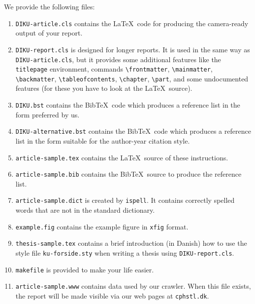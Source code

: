 \documentclass{DIKU-report}[2006/05/09]
\begin{document}
We provide the following files:
\begin{enumerate}
\item
\texttt{DIKU-article.cls} contains the \LaTeX\ code for producing the
camera-ready output of your report.

\item 
\texttt{DIKU-report.cls} is designed for longer reports.
It is used in the same way as \texttt{DIKU-article.cls}, but it
provides some additional features like the \verb|titlepage|
environment, commands \verb|\frontmatter|,
\verb|\mainmatter|, \verb|\backmatter|, \verb|\tableofcontents|,
\verb|\chapter|, \verb|\part|, and some undocumented features (for
these you have to look at the \LaTeX\ source). 
\item 
\texttt{DIKU.bst} contains the Bib\TeX\ code which produces a reference
list in the form preferred by us.

\item
\texttt{DIKU-alternative.bst} contains the Bib\TeX\ code which produces a reference list
in the form suitable for the author-year citation style.
\item
\texttt{article-sample.tex} contains the \LaTeX\ source of these
instructions.
\item
\texttt{article-sample.bib} contains the Bib\TeX\ source to produce
the reference list.

\item \texttt{article-sample.dict} is created by \texttt{ispell}.
  It contains correctly spelled words that are not in the standard
  dictionary.
\item
\texttt{example.fig} contains the example figure in
 \texttt{xfig} format.

\item
\texttt{thesis-sample.tex} contains a brief introduction (in Danish)
how to use the style file \verb|ku-forside.sty| when writing a thesis
using \verb|DIKU-report.cls|.
\item 
\texttt{makefile} is provided to make your life easier.
\item \texttt{article-sample.www} contains data used by our
  crawler. When this file exists, the report will be made visible via
  our web pages at \verb|cphstl.dk|.
\end{enumerate}
\end{document}
